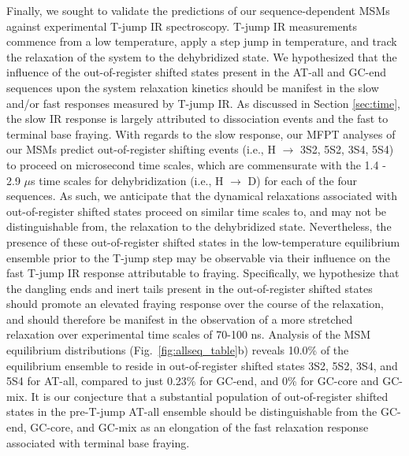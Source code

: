 \documentclass[journal=jpcbfk,manuscript=article]{achemso}
\begin{document}
Finally, we sought to validate the predictions of our sequence-dependent MSMs against experimental T-jump IR spectroscopy. T-jump IR measurements commence from a low temperature, apply a step jump in temperature, and track the relaxation of the system to the dehybridized state. We hypothesized that the influence of the out-of-register shifted states present in the AT-all and GC-end sequences upon the system relaxation kinetics should be manifest in the slow and/or fast responses measured by T-jump IR. As discussed in Section \ref{sec:time}, the slow IR response is largely attributed to dissociation events and the fast to terminal base fraying. With regards to the slow response, our MFPT analyses of our MSMs predict out-of-register shifting events (i.e., H $\rightarrow$ 3S2, 5S2, 3S4, 5S4) to proceed on microsecond time scales, which are commensurate with the 1.4 - 2.9 $\mu$s time scales for dehybridization (i.e., H $\rightarrow$ D) for each of the four sequences. As such, we anticipate that the dynamical relaxations associated with out-of-register shifted states proceed on similar time scales to, and may not be distinguishable from, the relaxation to the dehybridized state. Nevertheless, the presence of these out-of-register shifted states in the low-temperature equilibrium ensemble prior to the T-jump step may be observable via their influence on the fast T-jump IR response attributable to fraying. Specifically, we hypothesize that the dangling ends and inert tails present in the out-of-register shifted states should promote an elevated fraying response over the course of the relaxation, and should therefore be manifest in the observation of a more stretched relaxation over experimental time scales of 70-100 ns. Analysis of the MSM equilibrium distributions (Fig.~\ref{fig:allseq_table}b) reveals 10.0\% of the equilibrium ensemble to reside in out-of-register shifted states 3S2, 5S2, 3S4, and 5S4 for AT-all, compared to just 0.23\% for GC-end, and 0\% for GC-core and GC-mix. It is our conjecture that a substantial population of out-of-register shifted states in the pre-T-jump AT-all ensemble should be distinguishable from the GC-end, GC-core, and GC-mix as an elongation of the fast relaxation response associated with terminal base fraying.
\end{document}
